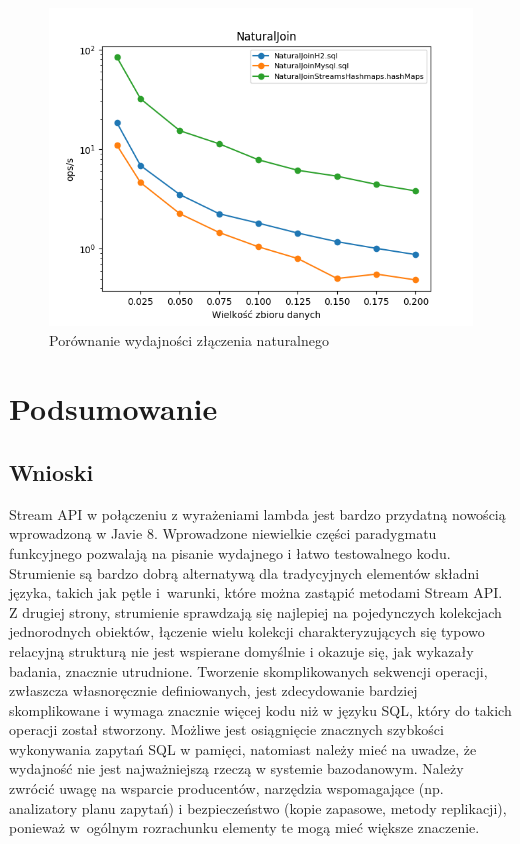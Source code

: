 \documentclass[12pt,twoside,openright]{extarticle}
\let\oldsection\section%
\renewcommand{\section}{\cleardoublepage\oldsection}%
\begin{document}
\begin{figure}[H]
    \centering
    \includegraphics[width=13cm]{plots/NaturalJoin}
    \caption{Porównanie wydajności złączenia naturalnego}
    \label{fig:naturaljoin}
\end{figure}

\section{Podsumowanie}

\subsection{Wnioski}

    Stream API w połączeniu z wyrażeniami lambda jest bardzo przydatną nowością wprowadzoną w Javie 8. Wprowadzone niewielkie części paradygmatu funkcyjnego pozwalają na pisanie wydajnego i łatwo testowalnego kodu. Strumienie są bardzo dobrą alternatywą dla tradycyjnych elementów składni języka, takich jak pętle i~warunki, które można zastąpić metodami Stream API. Z drugiej strony, strumienie sprawdzają się najlepiej na pojedynczych kolekcjach jednorodnych obiektów, łączenie wielu kolekcji charakteryzujących się typowo relacyjną strukturą nie jest wspierane domyślnie i okazuje się, jak wykazały badania, znacznie utrudnione. Tworzenie skomplikowanych sekwencji operacji, zwłaszcza własnoręcznie definiowanych, jest zdecydowanie bardziej skomplikowane i wymaga znacznie więcej kodu niż w języku SQL, który do takich operacji został stworzony. Możliwe jest osiągnięcie znacznych szybkości wykonywania zapytań SQL w pamięci, natomiast należy mieć na uwadze, że wydajność nie jest najważniejszą rzeczą w systemie bazodanowym. Należy zwrócić uwagę na wsparcie producentów, narzędzia wspomagające (np. analizatory planu zapytań) i bezpieczeństwo (kopie zapasowe, metody replikacji), ponieważ w~ogólnym rozrachunku elementy te mogą mieć większe znaczenie.
\end{document}
